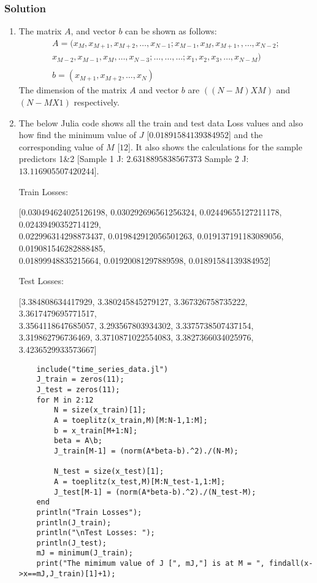 \documentclass{article}
\begin{document}
\subsubsection*{Solution}
\begin{enumerate}[label=\alph*]
    \item The matrix $A$, and vector $b$ can be shown as follows:
    \begin{align*}
        A = (x_M, x_{M+1}, x_{M+2}, \ldots, x_{N-1}; x_{M-1}, x_{M}, x_{M+1}, , \ldots, x_{N-2};\\ x_{M-2},
        x_{M-1}, x_{M}, \ldots, x_{N-3}; \ldots, \ldots, \ldots; x_{1}, x_{2}, x_{3},\ldots, x_{N-M})\\\\
        b = (x_{M+1}, x_{M+2}, \ldots, x_{N})
    \end{align*}
    The dimension of the matrix $A$ and vector $b$ are $((N-M) X M)$ and $(N-M X 1)$ respectively.
    \item The below Julia code shows all the train and test data Loss values and also how find the minimum value of $J$ [$0.01891584139384952$] and the corresponding value of $M$ [$12$]. It also shows the calculations for the sample predictors 1\&2 [Sample 1 J: $2.6318895838567373$ Sample 2 J: $13.116905507420244$].
    
    Train Losses: 
    
    [0.030494624025126198, 0.030292696561256324, 0.02449655127211178, 0.02439490352714129, \\0.022996314298873437, 0.019842912056501263, 0.019137191183089056, 0.019081546282888485, \\0.01899948835215664, 0.01920081297889598, 0.01891584139384952]
    
    Test Losses:
    
    [3.384808634417929, 3.380245845279127, 3.367326758735222, 3.3617479695771517, \\ 3.3564118647685057, 3.293567803934302, 3.3375738507437154, 3.319862796736469, 3.3710871022554083, 3.3827366034025976, 3.4236529933573667]
    \begin{verbatim}
    include("time_series_data.jl")
    J_train = zeros(11);
    J_test = zeros(11);
    for M in 2:12
        N = size(x_train)[1];
        A = toeplitz(x_train,M)[M:N-1,1:M];
        b = x_train[M+1:N];
        beta = A\b;
        J_train[M-1] = (norm(A*beta-b).^2)./(N-M);
    
        N_test = size(x_test)[1];
        A = toeplitz(x_test,M)[M:N_test-1,1:M];
        J_test[M-1] = (norm(A*beta-b).^2)./(N_test-M);
    end
    println("Train Losses");
    println(J_train);
    println("\nTest Losses: ");
    println(J_test);
    mJ = minimum(J_train);
    print("The mimimum value of J [", mJ,"] is at M = ", findall(x->x==mJ,J_train)[1]+1);
    

\end{verbatim}
\end{enumerate}
\end{document}
